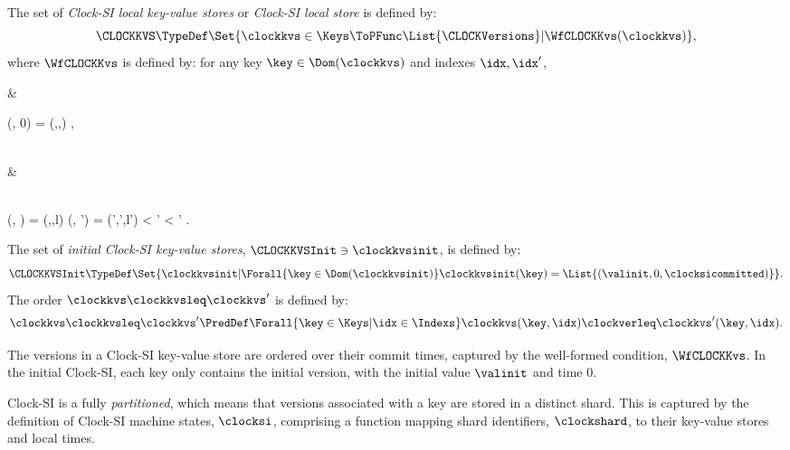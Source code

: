 \begin{definition}
The set of \emph{Clock-SI local key-value  stores} or \emph{Clock-SI local store} is defined by:
\[ \CLOCKKVS \TypeDef \Set{\clockkvs \in \Keys \ToPFunc \List{\CLOCKVersions} | \WfCLOCKKvs(\clockkvs)} , \]
where \( \WfCLOCKKvs \) is defined by: for any key \( \key \in \Dom(\clockkvs) \) and indexes \( \idx, \idx'\),
\begin{Formulae}
& \begin{Formula} \clockkvs(\key, 0) = (\valinit,\clocktimeinit,\clocksicommitted) , \label{equ:clock-si-kv-init}
\end{Formula}
\\ & \begin{Formula} 
\\ \clockkvs(\key, \idx) = (\val,\clocktime,l) 
\land \clockkvs(\key, \idx') = (\val',\clocktime',l')
\land \idx < \idx'
\implies \clocktime < \clocktime' . \label{equ:clock-si-kv-mono}
\end{Formula}
\end{Formulae}
The set of \emph{initial Clock-SI key-value stores}, 
\( \CLOCKKVSInit \ni \clockkvsinit \), is defined by:
\[ 
\CLOCKKVSInit \TypeDef
    \Set{\clockkvsinit | \Forall{\key \in \Dom(\clockkvsinit) } 
                    \clockkvsinit(\key) = \List{(\valinit,0,\clocksicommitted)}} .
\]
The order \( \clockkvs \clockkvsleq \clockkvs' \) is defined by:
\[
    \clockkvs \clockkvsleq \clockkvs' \PredDef
    \Forall{\key \in \Keys | \idx \in \Indexs }
    \clockkvs(\key,\idx) \clockverleq \clockkvs'(\key,\idx) .
\]
\end{definition} 

The versions in a Clock-SI key-value store are ordered over their commit times,
captured by the well-formed condition, \( \WfCLOCKKvs \).
In the initial Clock-SI, each key only contains the initial version,
with the initial value \( \valinit \) and time \( 0 \).

Clock-SI is a fully \emph{partitioned},
which means that versions associated with a key are stored in a distinct shard.
This is captured by the definition of Clock-SI machine states, \( \clocksi \),
comprising a function mapping shard identifiers, \( \clockshard \), to their key-value stores and local times.

